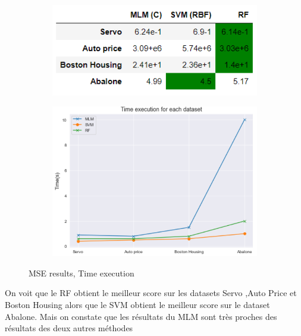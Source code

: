 \documentclass[12pt,a4paper]{report}
\begin{document}
\begin{figure}[!h]
    \centering
    \begin{subfigure}[b]{0.4\textwidth}
        \includegraphics[width=\textwidth]{regr1.png}
    \end{subfigure}
    \begin{subfigure}[b]{0.5\textwidth}
        \includegraphics[width=\textwidth]{regr12.png}
    \end{subfigure}
    \caption{MSE results, Time execution}
\end{figure}
 

\par On voit que le RF obtient le meilleur score sur les datasets Servo ,Auto Price et Boston Housing alors que le SVM obtient le meilleur score sur le dataset Abalone. Mais on constate que les résultats du MLM sont très proches des résultats des deux autres méthodes\\
 
\end{document}

